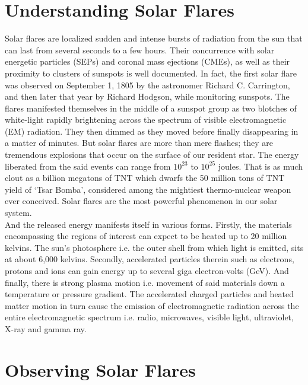 \documentclass[12pt,twoside]{reedthesis}
\begin{document}
\section{Understanding Solar Flares}	
Solar flares are localized sudden and intense bursts of radiation from the sun that can last from several seconds to a few hours. Their concurrence with solar energetic particles (SEPs) and coronal mass ejections (CMEs), as well as their proximity to clusters of sunspots is well documented. In fact, the first solar flare was observed on September 1, 1805 by the astronomer Richard C. Carrington, and then later that year by Richard Hodgson, while monitoring sunspots. The flares manifested themselves in the middle of a sunspot group as two blotches of white-light rapidly brightening across the spectrum of visible electromagnetic (EM) radiation. They then dimmed as they moved before finally disappearing in a matter of minutes. But solar flares are more than mere flashes; they are tremendous explosions that occur on the surface of our resident star. The energy liberated from the said events can range from $10^{23}$ to $10^{25}$ joules. That is as much clout as a billion megatons of TNT which dwarfs the 50 million tons of TNT yield of ‘Tsar Bomba’, considered among the mightiest thermo-nuclear weapon ever conceived. Solar flares are the most powerful phenomenon in our solar system. \\

And the released energy manifests itself in various forms. Firstly, the materials encompassing the regions of interest can expect to be heated up to 20 million kelvins. The sun’s photosphere i.e. the outer shell from which light is emitted, sits at about 6,000 kelvins. Secondly, accelerated particles therein such as electrons, protons and ions can gain energy up to several giga electron-volts (GeV). And finally, there is strong plasma motion i.e. movement of said materials down a temperature or pressure gradient. The accelerated charged particles and heated matter motion in turn cause the emission of electromagnetic radiation across the entire electromagnetic spectrum i.e. radio, microwaves, visible light, ultraviolet, X-ray and gamma ray. \\

\section{Observing Solar Flares} 
\end{document}
